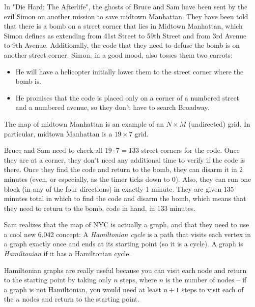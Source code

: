 \documentclass[12pt,twoside]{article}
\begin{document}
\begin{problem}{20}

In "Die Hard: The Afterlife", the ghosts of Bruce and Sam have been
sent by the evil Simon on another mission to save  midtown
Manhattan. They have been told that there is a bomb on a street
corner that lies in Midtown Manhattan, which Simon defines as
extending from 41st Street to 59th Street and from 3rd Avenue to 9th
Avenue. Additionally, the code that they need to defuse the bomb is
on another street corner. Simon, in a good mood, also tosses them
two carrots:

\begin{itemize}
\item He will have a helicopter initially lower them to the street corner where the bomb is.
\item He promises that the code is placed only on a corner of a numbered
street and a numbered avenue, so they don't have to search Broadway.
\end{itemize}

The map of midtown Manhattan is an example of an $N \times M$
(undirected) grid.  In particular, midtown Manhattan is a $19 \times
7$ grid.


Bruce and Sam need to check all $19 \cdot 7 = 133$ street corners
for the code.  Once they are at a corner, they don't need any
additional time to verify if the code is there.  Once they find the
code and return to the bomb, they can disarm it in 2 minutes (even,
or especially, as the timer ticks down to 0). Also, they can run one
block (in any of the four directions) in exactly 1 minute.
They are given 135 minutes total in which to find the code and
disarm the bomb, which means that they need to return to the bomb,
code in hand, in 133 minutes.

Sam realizes that the map of NYC is actually a graph, and that they
need to use a cool new 6.042 concept: A {\em Hamiltonian cycle} is a
path that visits each vertex in a graph exactly once and ends at its
starting point (so it is a cycle). A graph is {\em Hamiltonian} if
it has a Hamiltonian cycle.

Hamiltonian graphs are really useful because you can visit each node
and return to the starting point by taking only $n$ steps, where $n$
is the number of nodes -- if a graph is not Hamiltonian, you would
need at least $n+1$ steps to visit each of the $n$ nodes and return
to the starting point.


\end{problem}
\end{document}
